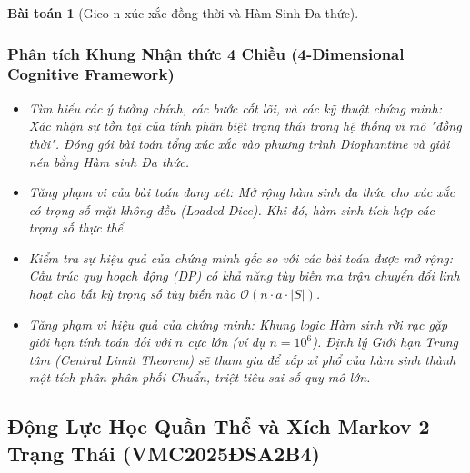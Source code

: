 \documentclass{article}
\newtheorem{baitoan}{Bài toán}
\begin{document}
\begin{baitoan}[Gieo n xúc xắc đồng thời và Hàm Sinh Đa thức]


 \subsubsection*{Phân tích Khung Nhận thức 4 Chiều (4-Dimensional Cognitive Framework)}
 \begin{itemize}
 \item \textit{Tìm hiểu các ý tưởng chính, các bước cốt lõi, và các kỹ thuật chứng minh}: Xác nhận sự tồn tại của tính phân biệt trạng thái trong hệ thống vĩ mô "đồng thời". Đóng gói bài toán tổng xúc xắc vào phương trình Diophantine và giải nén bằng Hàm sinh Đa thức.
 \item \textit{Tăng phạm vi của bài toán đang xét}: Mở rộng hàm sinh đa thức cho xúc xắc có trọng số mặt không đều (Loaded Dice). Khi đó, hàm sinh tích hợp các trọng số thực thể.
 \item \textit{Kiểm tra sự hiệu quả của chứng minh gốc so với các bài toán được mở rộng}: Cấu trúc quy hoạch động (DP) có khả năng tùy biến ma trận chuyển đổi linh hoạt cho bất kỳ trọng số tùy biến nào $\mathcal{O}(n \cdot a \cdot |S|)$.
 \item \textit{Tăng phạm vi hiệu quả của chứng minh}: Khung logic Hàm sinh rời rạc gặp giới hạn tính toán đối với $n$ cực lớn (ví dụ $n=10^6$). Định lý Giới hạn Trung tâm (Central Limit Theorem) sẽ tham gia để xấp xỉ phổ của hàm sinh thành một tích phân phân phối Chuẩn, triệt tiêu sai số quy mô lớn.
 \end{itemize}
\end{baitoan}




\subsection{Động Lực Học Quần Thể và Xích Markov 2 Trạng Thái (VMC2025ĐSA2B4)}
\end{document}
